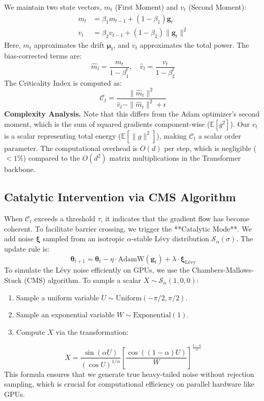 \documentclass{article}
\theoremstyle{plain}
\theoremstyle{definition}
\theoremstyle{remark}
\newcommand{\C}{\mathcal{C}} %
\newcommand{\thetavec}{\boldsymbol{\theta}}
\newcommand{\gvec}{\mathbf{g}}
\begin{document}
We maintain two state vectors, $m_t$ (First Moment) and $v_t$ (Second Moment):
\begin{align}
    m_t &= \beta_1 m_{t-1} + (1-\beta_1) \gvec_t \\
    v_t &= \beta_2 v_{t-1} + (1-\beta_2) \| \gvec_t \|^2
\end{align}
Here, $m_t$ approximates the drift $\boldsymbol{\mu}_t$, and $v_t$ approximates the total power. The bias-corrected terms are:
\begin{equation}
    \hat{m}_t = \frac{m_t}{1 - \beta_1^t}, \quad \hat{v}_t = \frac{v_t}{1 - \beta_2^t}
\end{equation}
The Criticality Index is computed as:
\begin{equation}
    \C_t = \frac{\| \hat{m}_t \|^2}{\hat{v}_t - \| \hat{m}_t \|^2 + \epsilon}
\end{equation}
\textbf{Complexity Analysis.} Note that this differs from the Adam optimizer's second moment, which is the sum of squared gradients component-wise ($\mathbb{E}[g^2]$). Our $v_t$ is a scalar representing total energy ($\mathbb{E}[\|g\|^2]$), making $\C_t$ a scalar order parameter. The computational overhead is $O(d)$ per step, which is negligible ($<1\%$) compared to the $O(d^2)$ matrix multiplications in the Transformer backbone.

\subsection{Catalytic Intervention via CMS Algorithm}
When $\C_t$ exceeds a threshold $\tau$, it indicates that the gradient flow has become coherent. To facilitate barrier crossing, we trigger the **Catalytic Mode**.
We add noise $\boldsymbol{\xi}$ sampled from an isotropic $\alpha$-stable Lévy distribution $\mathcal{S}_\alpha(\sigma)$. The update rule is:
\begin{equation}
    \thetavec_{t+1} = \thetavec_t - \eta \cdot \text{AdamW}(\gvec_t) + \lambda \cdot \boldsymbol{\xi}_{\text{Lévy}}
\end{equation}
To simulate the Lévy noise efficiently on GPUs, we use the Chambers-Mallows-Stuck (CMS) algorithm. To sample a scalar $X \sim \mathcal{S}_\alpha(1, 0, 0)$:
\begin{enumerate}
    \item Sample a uniform variable $U \sim \text{Uniform}(-\pi/2, \pi/2)$.
    \item Sample an exponential variable $W \sim \text{Exponential}(1)$.
    \item Compute $X$ via the transformation:
\end{enumerate}
\begin{equation}
    X = \frac{\sin(\alpha U)}{(\cos U)^{1/\alpha}} \left[ \frac{\cos((1-\alpha)U)}{W} \right]^{\frac{1-\alpha}{\alpha}}
\end{equation}
This formula ensures that we generate true heavy-tailed noise without rejection sampling, which is crucial for computational efficiency on parallel hardware like GPUs.
\end{document}
